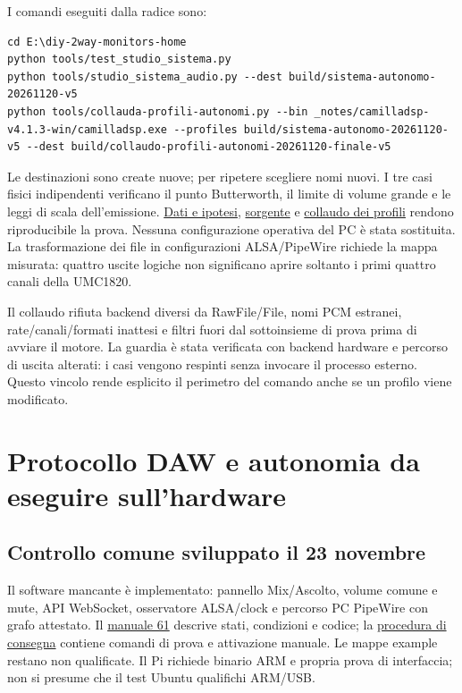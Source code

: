 \documentclass[
  italian,
  11pt,
  a4paper,
]{article}
\begin{document}
I comandi eseguiti dalla radice sono:

\begin{lstlisting}
cd E:\diy-2way-monitors-home
python tools/test_studio_sistema.py
python tools/studio_sistema_audio.py --dest build/sistema-autonomo-20261120-v5
python tools/collauda-profili-autonomi.py --bin _notes/camilladsp-v4.1.3-win/camilladsp.exe --profiles build/sistema-autonomo-20261120-v5 --dest build/collaudo-profili-autonomi-20261120-finale-v5
\end{lstlisting}

Le destinazioni sono create nuove; per ripetere scegliere nomi nuovi. I tre casi fisici
indipendenti verificano il punto Butterworth, il limite di volume grande e le leggi di scala
dell'emissione. \href{../../data/driver-candidati.json}{Dati e ipotesi},
\href{../../tools/studio_sistema_audio.py}{sorgente} e
\href{../../tools/collauda-profili-autonomi.py}{collaudo dei profili} rendono riproducibile
la prova. Nessuna configurazione operativa del PC è stata sostituita. La trasformazione dei
file in configurazioni ALSA/PipeWire richiede la mappa misurata: quattro uscite logiche non
significano aprire soltanto i primi quattro canali della UMC1820.

Il collaudo rifiuta backend diversi da RawFile/File, nomi PCM estranei, rate/canali/formati
inattesi e filtri fuori dal sottoinsieme di prova prima di avviare il motore. La guardia è
stata verificata con backend hardware e percorso di uscita alterati: i casi vengono respinti
senza invocare il processo esterno. Questo vincolo rende esplicito il perimetro del comando
anche se un profilo viene modificato.

\section{Protocollo DAW e autonomia da eseguire
sull'hardware}\label{protocollo-daw-e-autonomia-da-eseguire-sullhardware}

\subsection{Controllo comune sviluppato il 23
novembre}\label{controllo-comune-sviluppato-il-23-novembre}

Il software mancante è implementato: pannello Mix/Ascolto, volume comune e mute, API
WebSocket, osservatore ALSA/clock e percorso PC PipeWire con grafo attestato. Il
\href{../../docs/61-camilladsp-manuale-tecnico.md}{manuale 61} descrive stati, condizioni e
codice; la \href{../../config/controllo-ascolto/README.md}{procedura di consegna} contiene
comandi di prova e attivazione manuale. Le mappe example restano non qualificate. Il Pi
richiede binario ARM e propria prova di interfaccia; non si presume che il test Ubuntu
qualifichi ARM/USB.
\end{document}
